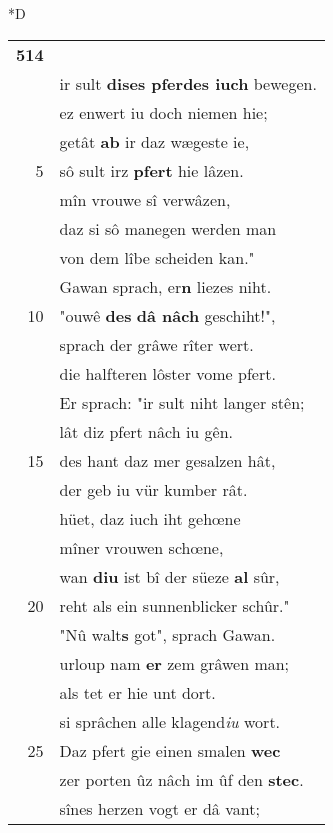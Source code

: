 \documentclass[8pt,a4paper,notitlepage]{article}
\begin{document}
\begin{table}[ht]
\begin{minipage}[t]{0.5\linewidth}
\small
\begin{center}*D
\end{center}
\begin{tabular}{rl}
\textbf{514} & \textbf{\begin{large}D\end{large}er} sprach: "welt ir râtes pflegen,\\ 
 & ir sult \textbf{dises pferdes iuch} bewegen.\\ 
 & ez enwert iu doch niemen hie;\\ 
 & getât \textbf{ab} ir daz wægeste ie,\\ 
5 & sô sult irz \textbf{pfert} hie lâzen.\\ 
 & mîn vrouwe sî verwâzen,\\ 
 & daz si sô manegen werden man\\ 
 & von dem lîbe scheiden kan."\\ 
 & Gawan sprach, er\textbf{n} liezes niht.\\ 
10 & "ouwê \textbf{des} \textbf{dâ nâch} geschiht!",\\ 
 & sprach der grâwe rîter wert.\\ 
 & die halfteren lôster vome pfert.\\ 
 & Er sprach: "ir sult niht langer stên;\\ 
 & lât diz pfert nâch iu gên.\\ 
15 & des hant daz mer gesalzen hât,\\ 
 & der geb iu vür kumber rât.\\ 
 & hüet, daz iuch iht gehœne\\ 
 & mîner vrouwen schœne,\\ 
 & wan \textbf{diu} ist bî der süeze \textbf{al} sûr,\\ 
20 & reht als ein sunnenblicker schûr."\\ 
 & "Nû walt\textbf{s} got", sprach Gawan.\\ 
 & urloup nam \textbf{er} zem grâwen man;\\ 
 & als tet er hie unt dort.\\ 
 & si sprâchen alle klagend\textit{iu} wort.\\ 
25 & Daz pfert gie einen smalen \textbf{wec}\\ 
 & zer porten ûz nâch im ûf den \textbf{stec}.\\ 
 & sînes herzen vogt er dâ vant;\\ 

\end{tabular}
\end{minipage}
\end{table}
\end{document}
